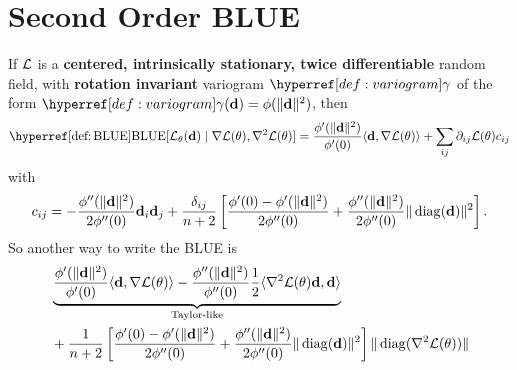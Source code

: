\section{Second Order BLUE}

\begin{lemma}
	If \(\mathcal{L}\) is a \textbf{centered, intrinsically stationary, twice
	differentiable} random field, with \textbf{rotation invariant} variogram
	\(\variogram\) of the form \(\variogram(\step)=\phi(\|\step\|^2)\), then
	\begin{equation*}
		\BLUE[\Loss_\param(\step)\mid \grad\Loss(\param), \hessian\Loss(\param)]
		= \frac{\phi'(\|\step\|^2)}{\phi'(0)}\langle \step, \grad\Loss(\param)\rangle
		+ \sum_{ij}\partial_{ij}\Loss(\param)c_{ij}
	\end{equation*}
	with
	\begin{equation*}
		c_{ij} =
			- \frac{\phi''(\|\mathbf{d}\|^2)}{2\phi''(0)}\mathbf{d}_i\mathbf{d}_j
			+ \frac{\delta_{ij}}{n+2}\left[
				\frac{\phi'(0) - \phi'(\|\mathbf{d}\|^2)}{2\phi''(0)}
				+ \frac{\phi''(\|\mathbf{d}\|^2)}{2\phi''(0)}\|\operatorname{diag}(\mathbf{d})\|^2
			\right].
	\end{equation*}
	So another way to write the BLUE is
	\begin{equation*}
	\begin{aligned}
		&\underbrace{
			\frac{\phi'(\|\mathbf{d}\|^2)}{\phi'(0)}\langle \mathbf{d}, \nabla\mathcal{L}(\theta)\rangle
			- \frac{\phi''(\|\mathbf{d}\|^2)}{\phi''(0)} \frac12\langle \nabla^2\mathcal{L}(\theta)\mathbf{d}, \mathbf{d}\rangle
		}_{\text{Taylor-like}}\\
		&+ \frac{1}{n+2}\left[
				\frac{\phi'(0) - \phi'(\|\mathbf{d}\|^2)}{2\phi''(0)}
				+ \frac{\phi''(\|\mathbf{d}\|^2)}{2\phi''(0)}\|\operatorname{diag}(\mathbf{d})\|^2
		\right]
		\|\operatorname{diag}(\nabla^2 \mathcal{L}(\theta))\|
	\end{aligned}
	\end{equation*}
\end{lemma}

